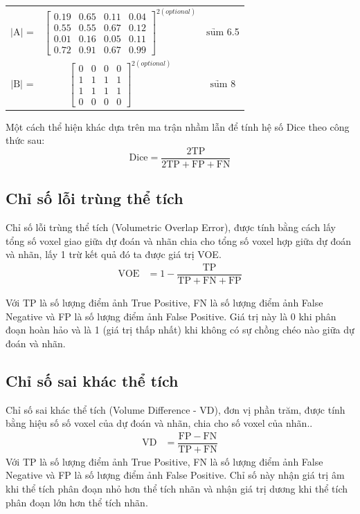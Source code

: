 \hspace{1.5cm}
\begin{tabular}{c c c}
	$|\mathrm{A}|$ =& 
	$\left[
	\begin{matrix}
		0.19 & 0.65 & 0.11 & 0.04\\
		0.55 & 0.55 & 0.67 & 0.12\\
		0.01 & 0.16 & 0.05 & 0.11\\
		0.72 & 0.91 & 0.67 & 0.99
	\end{matrix}
	\right]^{2 (optional)}$ & $\underrightarrow{\mathrm{sum}}$ 6.5\\ 
	$|\mathrm{B}|$ =&
	$\left[
	\begin{matrix}
	0 & 0 & 0 & 0\\
	1 & 1 & 1 & 1\\
	1 & 1 & 1 & 1\\
	0 & 0 & 0 & 0
	\end{matrix}
	\right]^{2 (optional)}$ & $\underrightarrow{\mathrm{sum}}$ 8
\end{tabular}

Một cách thể hiện khác dựa trên ma trận nhầm lẫn để tính hệ số Dice theo công thức sau:
\begin{equation}
	\mathrm{Dice} = \mathrm{\frac{2TP}{2TP + FP + FN}}
\end{equation}

\subsection{Chỉ số lỗi trùng thể tích}
Chỉ số lỗi trùng thể tích (Volumetric Overlap Error), được tính bằng cách lấy tổng số voxel giao giữa dự đoán và nhãn chia cho tổng số voxel hợp giữa dự đoán và nhãn, lấy 1 trừ kết quả đó ta được giá trị VOE.
\begin{align}
    \mathrm{VOE} &= 1 - \mathrm{\dfrac{TP}{TP + FN + FP}}
\end{align}

Với TP là số lượng điểm ảnh True Positive, FN là số lượng điểm ảnh False Negative và FP là số lượng điểm ảnh False Positive. Giá trị này là 0 khi phân đoạn hoàn hảo và là 1 (giá trị thấp nhất) khi không có sự chồng chéo nào giữa dự đoán và nhãn.

\subsection{Chỉ số sai khác thể tích}
Chỉ số sai khác thể tích (Volume Difference - VD), đơn vị phần trăm, được tính bằng hiệu số số voxel của dự đoán và nhãn, chia cho số voxel của nhãn..
\begin{align}
    \mathrm{VD} &= \mathrm{\dfrac{FP - FN}{TP + FN}}
\end{align}
Với TP là số lượng điểm ảnh True Positive, FN là số lượng điểm ảnh False Negative và FP là số lượng điểm ảnh False Positive. Chỉ số này nhận giá trị âm khi thể tích phân đoạn nhỏ hơn thể tích nhãn và nhận giá trị dương khi thể tích phân đoạn lớn hơn thể tích nhãn.
